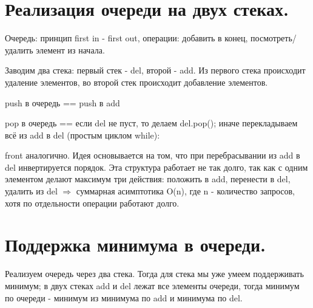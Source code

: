\setcounter{section}{6}
\section{Реализация очереди на двух стеках.}
Очередь: принцип first in - first out, операции: добавить в конец, посмотреть/удалить элемент из начала. \par
Заводим два стека: первый стек - del, второй - add. Из первого стека происходит удаление элементов, во второй стек происходит добавление элементов. \par
push в очередь == push в add \par
pop в очередь == если del не пуст, то делаем del.pop(); иначе перекладываем всё из add в del (простым циклом while):

front аналогично. Идея основывается на том, что при перебрасывании из add в del инвертируется порядок. Эта структура работает не так долго, так как с одним элементом делают максимум три действия: положить в add, перенести в del, удалить из del $\Rightarrow$ суммарная асимптотика O(n), где n - количество запросов, хотя по отдельности операции работают долго.

\setcounter{section}{7}
\section{Поддержка минимума в очереди.}
Реализуем очередь через два стека. Тогда для стека мы уже умеем поддерживать минимум; в двух стеках add и del лежат все элементы очереди, тогда минимум по очереди - минимум из минимума по add и минимума по del.